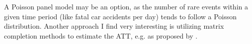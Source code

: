 \documentclass[11pt]{article}
\begin{document}
A Poisson panel model may be an option, as the number of rare events within a given time period (like fatal car accidents per day) tends to follow a Poisson distribution. Another approach I find very interesting is utilizing matrix completion methods to estimate the ATT, e.g. as proposed by \citet{Athey_2021}.







\end{document}
